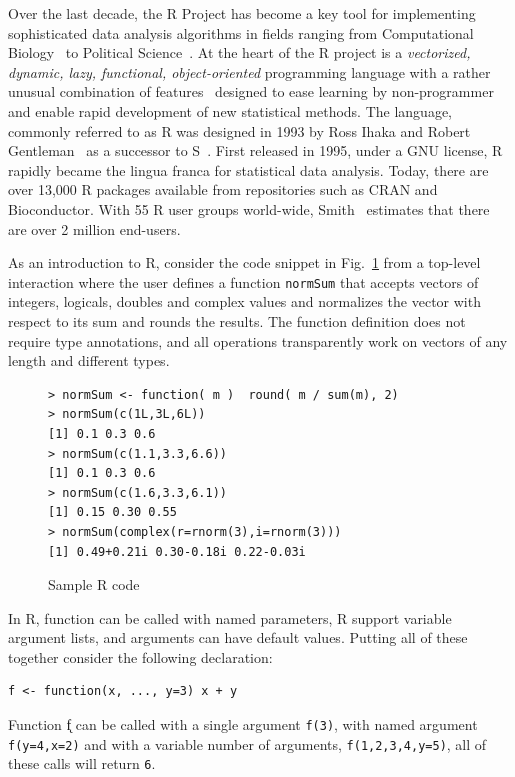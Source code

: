\documentclass[acmsmall,review,anonymous]{acmart}\settopmatter{printfolios=true,printccs=false,printacmref=false}
\newcommand{\code}[1]{{\lstinline[style=Rin]!#1!}\xspace}
\begin{document}
Over the last decade, the R Project has become a key tool for implementing
sophisticated data analysis algorithms in fields ranging from Computational
Biology~\cite{R05} to Political Science~\cite{R:Keele:2008}. At the heart of
the R project is a \emph{vectorized, dynamic, lazy, functional,
  object-oriented} programming language with a rather unusual combination of
features~\cite{ecoop12} designed to ease learning by non-programmer and
enable rapid development of new statistical methods.  The language, commonly
referred to as R was designed in 1993 by Ross Ihaka and Robert
Gentleman~\cite{R96} as a successor to S~\cite{S88}.  First released in
1995, under a GNU license, R rapidly became the lingua franca for
statistical data analysis. Today, there are over 13,000 R packages available
from repositories such as CRAN and Bioconductor.  With 55 R user groups
world-wide, Smith~\cite{eco11} estimates that there are over 2 million
end-users.

As an introduction to R, consider the code snippet in Fig.~\ref{sample} from
a top-level interaction where the user defines a function \code{normSum}
that accepts vectors of integers, logicals, doubles and complex values and
normalizes the vector with respect to its sum and rounds the results. The
function definition does not require type annotations, and all operations
transparently work on vectors of any length and different types.

\begin{figure}[!hb]{\small
\begin{lstlisting}
> normSum <- function( m )  round( m / sum(m), 2)
> normSum(c(1L,3L,6L))
[1] 0.1 0.3 0.6
> normSum(c(1.1,3.3,6.6))
[1] 0.1 0.3 0.6
> normSum(c(1.6,3.3,6.1))
[1] 0.15 0.30 0.55
> normSum(complex(r=rnorm(3),i=rnorm(3)))
[1] 0.49+0.21i 0.30-0.18i 0.22-0.03i
\end{lstlisting}}
\caption{Sample R code}\label{sample}
\end{figure}

In R, function can be called with named parameters, R support variable
argument lists, and arguments can have default values. Putting all of these
together consider the following declaration:

\begin{lstlisting}
f <- function(x, ..., y=3) x + y
\end{lstlisting}

\noindent
Function \k{f} can be called with a single argument \code{f(3)}, with named
argument \code{f(y=4,x=2)} and with a variable number of arguments,
\code{f(1,2,3,4,y=5)}, all of these calls will return \code{6}.
\end{document}
